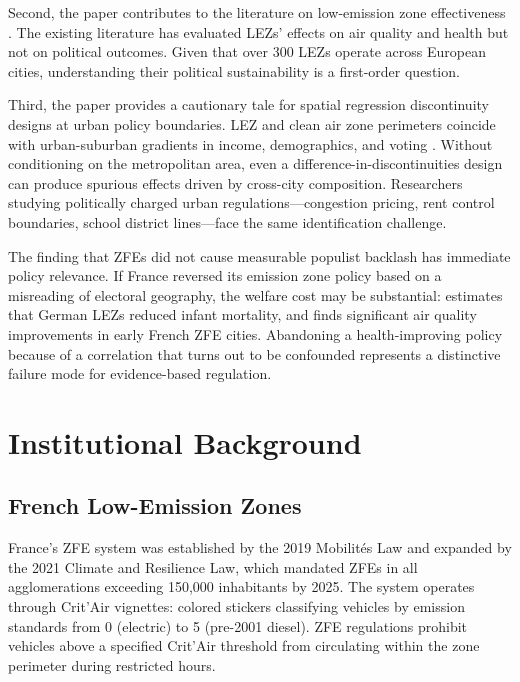 \documentclass[12pt]{article}
\begin{document}
Second, the paper contributes to the literature on low-emission zone effectiveness \citep{wolff2014lez,gehrsitz2017lez}. The existing literature has evaluated LEZs' effects on air quality and health but not on political outcomes. Given that over 300 LEZs operate across European cities, understanding their political sustainability is a first-order question.

Third, the paper provides a cautionary tale for spatial regression discontinuity designs at urban policy boundaries. LEZ and clean air zone perimeters coincide with urban-suburban gradients in income, demographics, and voting \citep{keele2015geo}. Without conditioning on the metropolitan area, even a difference-in-discontinuities design can produce spurious effects driven by cross-city composition. Researchers studying politically charged urban regulations---congestion pricing, rent control boundaries, school district lines---face the same identification challenge.

The finding that ZFEs did not cause measurable populist backlash has immediate policy relevance. If France reversed its emission zone policy based on a misreading of electoral geography, the welfare cost may be substantial: \citet{gehrsitz2017lez} estimates that German LEZs reduced infant mortality, and \citet{berestycki2024zfe} finds significant air quality improvements in early French ZFE cities. Abandoning a health-improving policy because of a correlation that turns out to be confounded represents a distinctive failure mode for evidence-based regulation.

\section{Institutional Background}

\subsection{French Low-Emission Zones}

France's ZFE system was established by the 2019 Mobilit\'{e}s Law and expanded by the 2021 Climate and Resilience Law, which mandated ZFEs in all agglomerations exceeding 150,000 inhabitants by 2025. The system operates through Crit'Air vignettes: colored stickers classifying vehicles by emission standards from 0 (electric) to 5 (pre-2001 diesel). ZFE regulations prohibit vehicles above a specified Crit'Air threshold from circulating within the zone perimeter during restricted hours.
\end{document}
